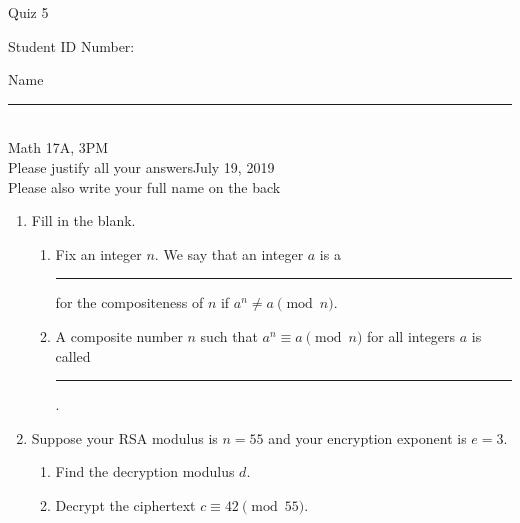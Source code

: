\documentclass[12pt]{article}
\begin{document}
\begin{flushleft} 
\centerline{\LARGE{Quiz 5}} 
\vspace{5 mm}
{Student ID Number:}\hfill  
{Name \rule {2 in}{0.01in}}\\
Math 17A, 3PM
\\
{Please justify all your answers}\hfill {July 19, 2019}
\\
{Please also write your full name on the back} 

\medskip
\end{flushleft}

\begin{enumerate}
	\item Fill in the blank.\begin{enumerate}
		\item Fix an integer $n$. We say that an integer $a$ is a \rule{3.5cm}{.15mm} for the compositeness of $n$ if $a^n\neq a \pmod{n}$.
		\item A composite number $n$ such that $a^n \equiv a \pmod {n}$ for all integers $a$ is called \rule{3.5cm}{.15mm}.
	\end{enumerate}
	\item Suppose your RSA modulus is $n = 55$ and your encryption exponent is $e = 3$.
	\begin{enumerate}
		\item Find the decryption modulus $d$.
		\vfill
		\item Decrypt the ciphertext $c\equiv 42 \pmod{55}$.
	\end{enumerate}
	\vfill
\end{enumerate}

\end{document}
